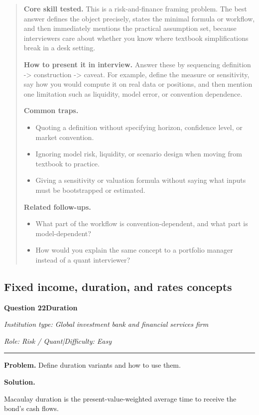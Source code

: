 \documentclass[11pt,letterpaper,openany]{book}
\newenvironment{EditorialNote}
  {\begin{quote}\small\setlength{\parskip}{0.25em}}
  {\end{quote}}
\newcommand{\QuestionSpacer}{\vspace{0.4em}}
\newcommand{\InterviewQuestionHeader}[5]{%
  \vspace{1.0em}%
  {\large\bfseries #1\enspace #4\par}%
  {\small\itshape Institution type: #2\par}%
  {\small\itshape Role: #3\enspace |\enspace Difficulty: #5\par}%
  \vspace{0.25em}\hrule\vspace{0.45em}%
}
\begin{document}
\begin{EditorialNote}


\textbf{Core skill tested.} This is a risk-and-finance framing problem. The best answer defines the object precisely, states the minimal formula or workflow, and then immediately mentions the practical assumption set, because interviewers care about whether you know where textbook simplifications break in a desk setting.

\textbf{How to present it in interview.} Answer these by sequencing definition -> construction -> caveat. For example, define the measure or sensitivity, say how you would compute it on real data or positions, and then mention one limitation such as liquidity, model error, or convention dependence.

\textbf{Common traps.}
\begin{itemize}
\item Quoting a definition without specifying horizon, confidence level, or market convention.
\item Ignoring model risk, liquidity, or scenario design when moving from textbook to practice.
\item Giving a sensitivity or valuation formula without saying what inputs must be bootstrapped or estimated.
\end{itemize}

\textbf{Related follow-ups.}
\begin{itemize}
\item What part of the workflow is convention-dependent, and what part is model-dependent?
\item How would you explain the same concept to a portfolio manager instead of a quant interviewer?
\end{itemize}


\end{EditorialNote}
\QuestionSpacer

\subsection{Fixed income, duration, and rates concepts}

\InterviewQuestionHeader{Question 22}{Global investment bank and financial services firm}{Risk / Quant}{Duration}{Easy}
\textbf{Problem.} Define duration variants and how to use them.

\textbf{Solution.}

Macaulay duration is the present-value-weighted average time to receive the bond's cash flows.
\end{document}
